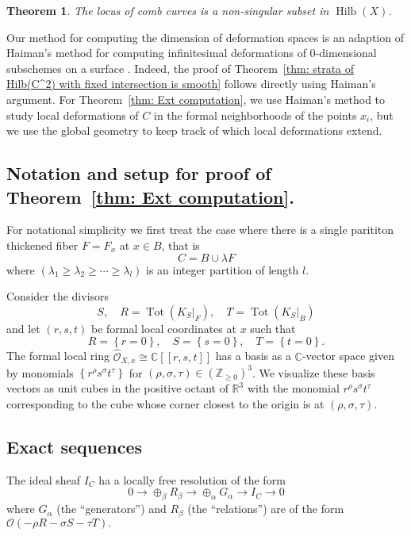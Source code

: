 \documentclass{amsart}
\newtheorem{theorem}{Theorem}%
\theoremstyle{definition}
\newcommand{\CC} {\mathbb{C}}          %
\newcommand{\RR} {\mathbb{R}}		%
\newcommand{\ZZ} {\mathbb{Z}}		%
\renewcommand{\O}{\mathcal{O}}
\newcommand{\Hilb}{\operatorname{Hilb}}
\newcommand{\Tot}{\operatorname{Tot}}
\begin{document}
\begin{theorem}\label{thm: locus of comb curves is smooth}
The locus of comb curves is a non-singular subset in $\Hilb (X)$. 
\end{theorem}

Our method for computing the dimension of deformation spaces is an
adaption of Haiman's method for computing infinitesimal deformations
of 0-dimensional subschemes on a surface \cite{Haiman1998}. Indeed,
the proof of Theorem~\ref{thm: strata of Hilb(C^2) with fixed intersection
is smooth} follows directly using Haiman's argument. For
Theorem~\ref{thm: Ext computation}, we use Haiman's method to study
local deformations of $C$ in the formal neighborhoods of the points
$x_{i}$, but we use the global geometry to keep track of which local
deformations extend.

\subsection{Notation and setup for proof of Theorem~\ref{thm: Ext
computation}.}

For notational simplicity we first treat the case where there is a
single parititon thickened fiber $F=F_{x}$ at $x\in B$, that is
\[
C=B\cup \lambda F
\]
where $(\lambda_{1}\geq \lambda_{2}\geq \dotsb \geq \lambda_{l})$ is
an integer partition of length $l$.

Consider the divisors
\[
S,\quad R=\Tot (K_{S}|_{F}),\quad T=\Tot (K_{S}|_{B})
\]
and let $(r,s,t)$ be formal local coordinates at $x$ such that 
\[
R=\left\{r=0 \right\},\quad S=\left\{s=0 \right\},\quad T=\left\{t=0 \right\}.
\]
The formal local ring $\widehat{\O}_{X,x}\cong \CC [[r,s,t]]$ has a basis
as a $\CC$-vector space given by monomials
$\left\{r^{\rho}s^{\sigma}t^{\tau} \right\}$ for $(\rho, \sigma,
\tau)\in \left(\ZZ_{\geq 0} \right)^{3}$. We visualize these basis
vectors as unit cubes in the positive octant of $\RR^{3}$ with the
monomial $r^{\rho}s^{\sigma}t^{\tau}$ corresponding to the cube whose
corner closest to the origin is at $(\rho ,\sigma ,\tau)$.


\subsection{Exact sequences}

The ideal sheaf $I_{C}$ ha a locally free resolution of the form
\begin{equation}\label{eqn: R-->G-->I_C exact sequence}
0\to \oplus_{\beta}R_{\beta} \to \oplus_{\alpha }G_{\alpha } \to I_{C}
\to 0
\end{equation}
where $G_{\alpha}$ (the ``generators'') and $R_{\beta}$ (the
``relations'') are of the form $\O (-\rho R-\sigma S-\tau T).$
\end{document}
